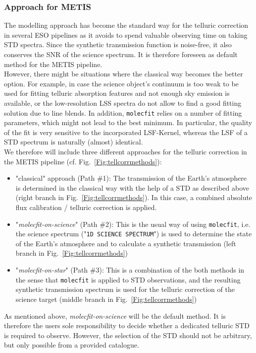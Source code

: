 \subsubsection{Approach for METIS}
The modelling approach has become the standard way for the telluric correction in several ESO pipelines as it avoids to spend valuable observing time on taking \ac{STD} spectra. Since the synthetic transmission function is noise-free, it also conserves the \ac{SNR} of the science spectrum. It is therefore  foreseen as default method for the \ac{METIS} pipeline.\\
However, there might be situations where the classical way becomes the better option. For example, in case the science object's continuum is too weak to be used for fitting telluric absorption features and not enough sky emission is available, or the low-resolution \ac{LSS} spectra do not allow to find a good fitting solution due to line blends. In addition, \texttt{molecfit} relies on a number of fitting parameters, which might not lead to the best minimum. In particular, the quality of the fit is very sensitive to the incorporated \ac{LSF}-Kernel, whereas the \ac{LSF} of a \ac{STD} spectrum is naturally (almost) identical.\\
We therefore will include three different approaches for the telluric correction in the \ac{METIS} pipeline (cf. Fig.~\ref{Fig:tellcorrmethods}):
\begin{itemize}
    \item "classical" approach (Path \#1): The transmission of the Earth's atmosphere is determined in the classical way with the help of a \ac{STD} as described above (right branch in Fig.~\ref{Fig:tellcorrmethods}). In this case, a combined absolute flux calibration / telluric correction is applied.
    \item "\textit{molecfit-on-science}"  (Path \#2): This is the usual way of using \texttt{molecfit}, i.e. the science spectrum ("\texttt{1D SCIENCE SPECTRUM}") is used to determine the state of the Earth's atmosphere and to calculate a synthetic transmission (left branch in Fig.~\ref{Fig:tellcorrmethods})
    \item "\textit{molecfit-on-star}"  (Path \#3): This is a combination of the both methods in the sense that \texttt{molecfit} is applied to \ac{STD} observations, and the resulting synthetic transmission spectrum is used for the telluric correction of the science target  (middle branch in Fig.~\ref{Fig:tellcorrmethods})
\end{itemize}
As mentioned above, \textit{molecfit-on-science} will be the default method. It is therefore the users sole responsibility to decide whether a dedicated telluric \ac{STD} is required to observe. However, the selection of the \ac{STD} should not be arbitrary, but only possible from a provided catalogue.\\
